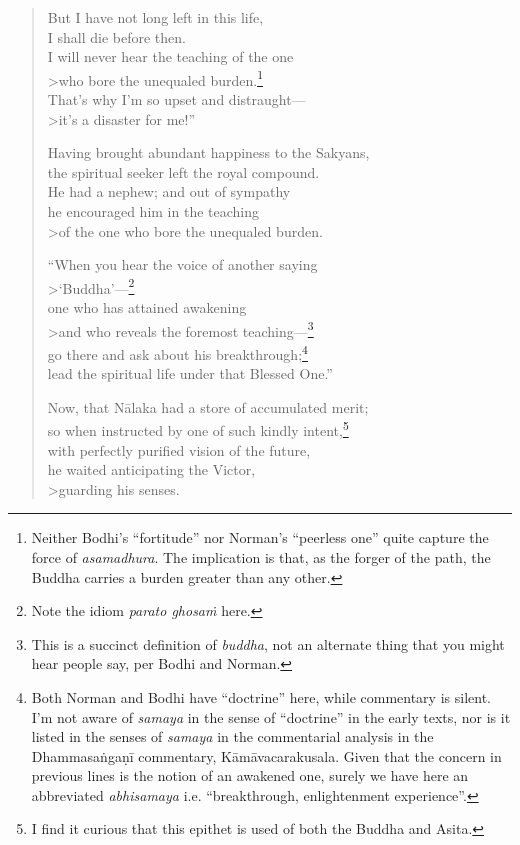 \documentclass[12pt,openany]{book}%
\begin{document}
\begin{verse}
But I have not long left in this life, \\
I shall die before then. \\
I will never hear the teaching of the one \\>who bore the unequaled burden.\footnote{Neither Bodhi’s “fortitude” nor Norman’s “peerless one” quite capture the force of \textit{asamadhura}. The implication is that, as the forger of the path, the Buddha carries a burden greater than any other. } \\
That’s why I’m so upset and distraught—\\>it’s a disaster for me!” 

Having brought abundant happiness to the Sakyans, \\
the spiritual seeker left the royal compound. \\
He had a nephew; and out of sympathy \\
he encouraged him in the teaching \\>of the one who bore the unequaled burden. 

“When you hear the voice of another saying \\>‘Buddha’—\footnote{Note the idiom \textit{parato \textsanskrit{ghosaṁ}} here. } \\
one who has attained awakening \\>and who reveals the foremost teaching—\footnote{This is a succinct definition of \textit{buddha}, not an alternate thing that you might hear people say, per Bodhi and Norman. } \\
go there and ask about his breakthrough;\footnote{Both Norman and Bodhi have “doctrine” here, while commentary is silent. I’m not aware of \textit{samaya} in the sense of “doctrine” in the early texts, nor is it listed in the senses of \textit{samaya} in the commentarial analysis in the \textsanskrit{Dhammasaṅgaṇī} commentary, \textsanskrit{Kāmāvacarakusala}. Given that the concern in previous lines is the notion of an awakened one, surely we have here an abbreviated \textit{abhisamaya} i.e. “breakthrough, enlightenment experience”. } \\
lead the spiritual life under that Blessed One.” 

Now, that \textsanskrit{Nālaka} had a store of accumulated merit; \\
so when instructed by one of such kindly intent,\footnote{I find it curious that this epithet is used of both the Buddha and Asita. } \\
with perfectly purified vision of the future, \\
he waited anticipating the Victor, \\>guarding his senses. 


\end{verse}
\end{document}
